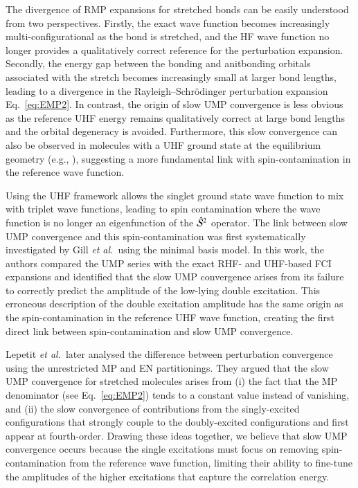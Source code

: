 \documentclass[aps,prb,reprint,noshowkeys,superscriptaddress]{revtex4-1}
\newcommand{\latin}[1]{#1}
\newcommand{\eg}{\latin{e.g.}}
\newcommand{\etal}{\textit{et al.}}
\newcommand{\cS}{\mathcal{S}}
\begin{document}
The divergence of RMP expansions for stretched bonds can be easily understood from two perspectives.\cite{Gill_1988a}
Firstly, the exact wave function becomes increasingly multi-configurational as the bond is stretched, and the 
HF wave function no longer provides a qualitatively correct reference for the perturbation expansion.
Secondly, the energy gap between the bonding and anitbonding orbitals associated with the stretch becomes
increasingly small at larger bond lengths, leading to a divergence in the Rayleigh--Schr\"odinger perturbation
expansion Eq.~\eqref{eq:EMP2}.
In contrast, the origin of slow UMP convergence is less obvious as the reference UHF energy remains
qualitatively correct at large bond lengths and the orbital degeneracy is avoided.
Furthermore, this slow convergence can also be observed in molecules with a UHF ground state at the equilibrium
geometry (\eg, ), suggesting a more fundamental link with spin-contamination 
in the reference wave function.\cite{Nobes_1987}

Using the UHF framework allows the singlet ground state wave function to mix with triplet wave functions, 
leading to spin contamination where the wave function is no longer an eigenfunction of the $\Hat{\cS}^2$ operator.
The link between slow UMP convergence and this spin-contamination was first systematically investigated
by Gill \etal\ using the minimal basis  model.\cite{Gill_1988}
In this work, the authors compared the UMP series with the exact RHF- and UHF-based FCI expansions
and identified that the slow UMP convergence arises from its failure to correctly predict the amplitude of the
low-lying double excitation.
This erroneous description of the double excitation amplitude has the same origin as the spin-contamination in the reference
UHF wave function, creating the first direct link between spin-contamination and slow UMP convergence.\cite{Gill_1988}

Lepetit \etal\ later analysed the difference between perturbation convergence using the unrestricted MP 
and EN partitionings. \cite{Lepetit_1988}
They argued that the slow UMP convergence for stretched molecules arises from 
(i) the fact that the MP denominator (see Eq.~\ref{eq:EMP2})
tends to a constant value instead of vanishing, and (ii) the slow convergence of contributions from the 
singly-excited configurations that strongly couple to the doubly-excited configurations and first
appear at fourth-order.\cite{Lepetit_1988}
Drawing these ideas together, we believe that slow UMP convergence occurs because the single excitations must focus on removing
spin-contamination from the reference wave function, limiting their ability to fine-tune the amplitudes of the higher 
excitations that capture the correlation energy.
\end{document}
